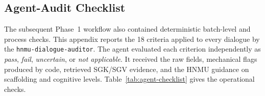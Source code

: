\documentclass[conference]{IEEEtran}
\begin{document}
\subsection{Agent-Audit Checklist}

The subsequent Phase~1 workflow also contained deterministic batch-level and
process checks. This appendix reports the 18 criteria applied to every dialogue
by the \texttt{hnmu-dialogue-auditor}. The agent evaluated each criterion
independently as \textit{pass}, \textit{fail}, \textit{uncertain}, or
\textit{not applicable}. It received the raw fields, mechanical flags produced
by code, retrieved SGK/SGV evidence, and the HNMU guidance on scaffolding and
cognitive levels. Table~\ref{tab:agent-checklist} gives the operational checks.

\begingroup
\scriptsize
\setlength{\tabcolsep}{2.5pt}
\renewcommand{\arraystretch}{0.98}
\setlength{\LTpre}{4pt}
\setlength{\LTpost}{0pt}
\end{document}
